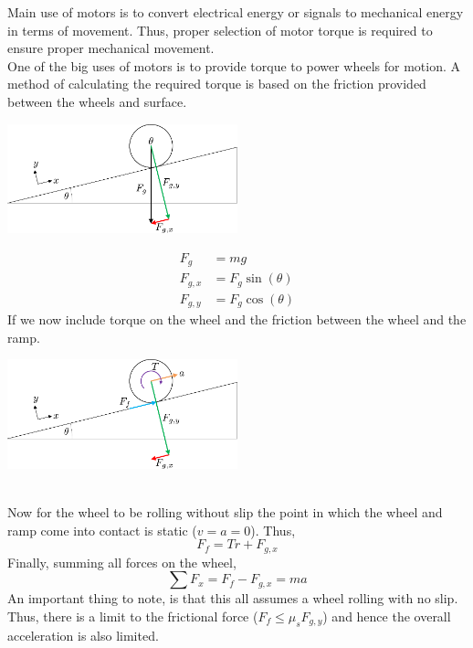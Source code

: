 \documentclass[paper=a4, fontsize=11pt]{article} %
\numberwithin{equation}{section} %
\numberwithin{figure}{section} %
\numberwithin{table}{section} %
\begin{document}
Main use of motors is to convert electrical energy or signals to mechanical energy in terms of movement. Thus, proper selection of motor torque is required to ensure proper mechanical movement.\\

One of the big uses of motors is to provide torque to power wheels for motion. A method of calculating the required torque is based on the friction provided between the wheels and surface.\\

\begin{minipage}{\textwidth}
	\centering
	\includegraphics[width=0.5\textwidth]{./ramps/ramp1.pdf}
\end{minipage}

\begin{align*}
	F_g &= mg\\
	F_{g,x} &= F_g \sin(\theta)\\
	F_{g,y} &= F_g \cos(\theta)
\end{align*}
If we now include torque on the wheel and the friction between the wheel and the ramp.\\

\begin{minipage}{\textwidth}
	\centering
	\includegraphics[width=0.5\textwidth]{./ramps/ramp2.pdf}
\end{minipage}
\vspace{1em}\\
Now for the wheel to be rolling without slip the point in which the wheel and ramp come into contact is static ($v = a = 0$). Thus,
\begin{equation*}
	F_f = Tr + F_{g,x}
\end{equation*}
Finally, summing all forces on the wheel,
\begin{equation*}
	\sum F_x = F_f - F_{g,x} = ma
\end{equation*}
An important thing to note, is that this all assumes a wheel rolling with no slip. Thus, there is a limit to the frictional force ($F_f \leq \mu_s F_{g,y}$) and hence the overall acceleration is also limited.
\end{document}
